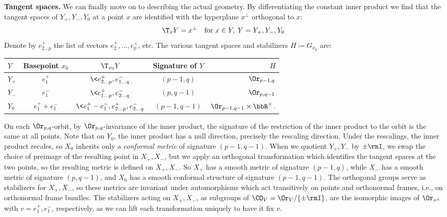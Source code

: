 \textbf{Tangent spaces.} We can finally move on to describing the actual geometry. By differentiating the constant inner product we find that the tangent spaces of $Y_+,Y_-,Y_0$ at a point $x$ are identified with the hyperplane $x^\perp$ orthogonal to $x$:
\[\T_x Y=x^\perp\quad \text{for }x\in Y,\; Y=Y_+,Y_-,Y_0\]
Denote by $e^+_{2\ldots p}$ the list of vectors $e_2^+,\ldots,e^+_p$, etc. The various tangent spaces and stabilizers $H\coloneqq G_{x_0}$ are:
\begin{center}
    \begin{tabular}{l c c c r} 
     $Y$ & Basepoint $x_0$ & $\T_{x_0}Y$ & Signature of $Y$ & $H$\\ [0.5ex] 
     \hline
     $Y_+$ & $e_1^+$ & $\<e^+_{2\ldots p},e^-_{1\ldots q}\>$ & $(p-1,q)$ & $\Or_{p-1,q}$\\ 
     $Y_-$ & $e_1^-$ & $\<e^+_{1\ldots p},e^-_{2\ldots q}\>$ & $(p,q-1)$ & $\Or_{p,q-1}$\\ 
     $Y_0$ & $e_1^++e_1^-$ & $\<e^+_1-e^-_1,e^+_{2\ldots p},e^-_{2\ldots q}\>$ & $(p-1,q-1)$ & $\Or_{p-1,q-1}\times \bbR^\times$.\\
     \hline
    \end{tabular}
\end{center}

On each $\Or_{p,q}$-orbit, by $\Or_{p,q}$-invariance of the inner product, the signature of the restriction of the inner product to the orbit is the same at all points. Note that on $Y_0$, the inner product has a null direction, precisely the rescaling direction. Under the rescalings, the inner product recales, so $X_0$ inherits only a \emph{conformal metric} of signature $(p-1,q-1)$. When we quotient $Y_+,Y_-$ by $\pm\rmI$, we swap the choice of preimage of the resulting point in $X_+,X_-$, but we apply an orthogonal transformation which identifies the tangent spaces at the two points, so the resulting metric is defined on $X_+,X_-$. So $X_+$ has a smooth metric of signature $(p-1,q)$, while $X_-$ has a smooth metric of signature $(p,q-1)$, and $X_0$ has a smooth conformal structure of signature $(p-1,q-1)$. The orthogonal groups serve as stabilizers for $X_+,X_-$, so these metrics are invariant under automorphisms which act transitively on points and orthonormal frames, i.e., on orthonormal frame bundles. The stabilizers acting on $X_+,X_-$, as subgroups of $\CO_V=\Or_V\slash\{\pm\rmI\}$, are the isomorphic images of $\Or_{v^\perp}$ with $v=e_1^+,e_1^-$, respectively, as we can lift each transformation uniquely to have it fix $v$.

